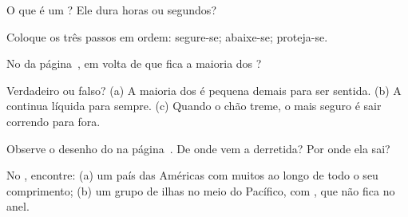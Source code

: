 \begin{exercise}[$\star$]\label{exo:g4:volcanoes-earthquakes-first-look:2}
O que é um ? Ele dura horas ou segundos?
\end{exercise}

\begin{exercise}[$\star$]\label{exo:g4:volcanoes-earthquakes-first-look:3}
Coloque os três passos em ordem: segure-se; abaixe-se; proteja-se.
\end{exercise}

\begin{exercise}[$\star$]\label{exo:g4:volcanoes-earthquakes-first-look:4}
No  da página~\pageref{fig:g4:volcanoes-earthquakes-first-look:map}, em volta de
que  fica a maioria dos ?
\end{exercise}

\begin{exercise}[$\star$]\label{exo:g4:volcanoes-earthquakes-first-look:5}
Verdadeiro ou falso? (a) A maioria dos  é pequena demais para ser
sentida. (b) A  continua líquida para sempre. (c) Quando o chão treme,
o mais seguro é sair correndo para fora.
\end{exercise}

\begin{exercise}[$\star$]\label{exo:g4:volcanoes-earthquakes-first-look:6}
Observe o desenho do  na página~\pageref{fig:g4:volcanoes-earthquakes-first-look:volcano}.
De onde vem a  derretida? Por onde ela sai?
\end{exercise}

\begin{exercise}[$\star\star$]\label{exo:g4:volcanoes-earthquakes-first-look:7}
No , encontre: (a) um país das Américas com muitos  ao longo de
todo o seu comprimento; (b) um grupo de ilhas no meio do  Pacífico,
com , que não fica no anel.
\end{exercise}

